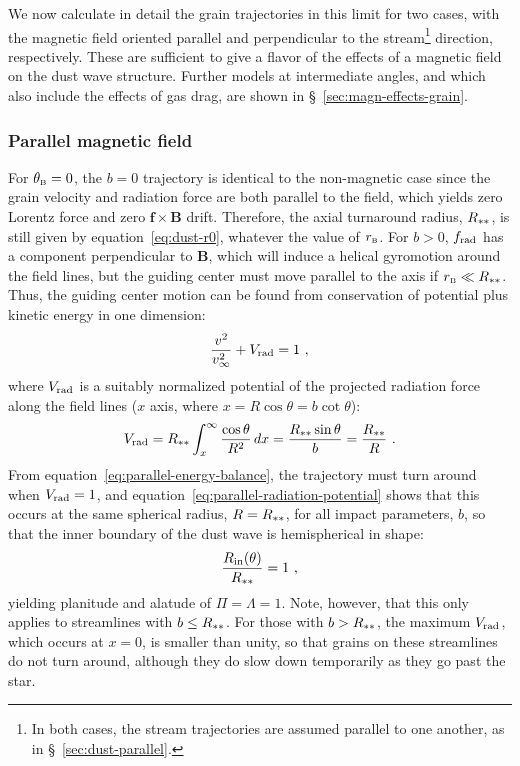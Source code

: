 We now calculate in detail the grain trajectories in this limit for
two cases, with the magnetic field oriented parallel and perpendicular
to the stream\footnote{In both cases, the stream trajectories are
  assumed parallel to one another, as in \S~\ref{sec:dust-parallel}.}
direction, respectively. These are sufficient to give a flavor of the
effects of a magnetic field on the dust wave structure.  Further
models at intermediate angles, and which also include the effects of
gas drag, are shown in \S~\ref{sec:magn-effects-grain}.

\subsubsection{Parallel magnetic field}
\label{sec:parall-magn-field}

For \(\theta_{\scriptscriptstyle\text{B}} = 0\), the \(b = 0\) trajectory is identical to the
non-magnetic case since the grain velocity and radiation force are
both parallel to the field, which yields zero Lorentz force and zero
\(\bm{f} \times \bm{B}\) drift. Therefore, the axial turnaround radius,
\(R_{**}\), is still given by equation~\eqref{eq:dust-r0},
whatever the value of \(r_{\scriptscriptstyle\text{B}}\).  For \(b > 0 \), \(f_{\text{rad}}\) has
a component perpendicular to \(\bm{B}\), which will induce a helical
gyromotion around the field lines, but the guiding center must move
parallel to the axis if \(r_{\scriptscriptstyle\text{B}} \ll R_{**}\).  Thus, the guiding
center motion can be found from conservation of potential plus kinetic
energy in one dimension:
\begin{equation}
  \label{eq:parallel-energy-balance}
  \frac{v^2}{v_\infty^2} + V_{\text{rad}} = 1 \ , 
\end{equation}
where \(V_{\text{rad}}\) is a suitably normalized potential of the projected
radiation force along the field lines (\(x\) axis, where
\(x = R \cos\theta = b \cot\theta\)):
\begin{equation}
  \label{eq:parallel-radiation-potential}
  V_{\text{rad}} = R_{**} \int_x^\infty \frac{\cos\theta}{R^2}\, dx
  = \frac{R_{**}\sin\theta}{b}
  = \frac{R_{**}}{R} \ .
\end{equation}
From equation~\eqref{eq:parallel-energy-balance}, the trajectory must
turn around when \(V_{\text{rad}} = 1\), and
equation~\eqref{eq:parallel-radiation-potential} shows that this
occurs at the same spherical radius, \(R = R_{**}\), for all
impact parameters, \(b\), so that the inner boundary of the dust wave
is hemispherical in shape:
\begin{equation}
  \label{eq:thB-0-shape}
  \frac{R_{\text{in}}(\theta)} {R_{**}} = 1 \ ,
\end{equation}
yielding planitude and alatude of \(\Pi = \Lambda = 1\).  Note, however, that
this only applies to streamlines with \(b \le R_{**}\).  For those
with \(b > R_{**}\), the maximum \(V_{\text{rad}}\), which occurs at
\(x = 0\), is smaller than unity, so that grains on these streamlines
do not turn around, although they do slow down temporarily as they go
past the star.

